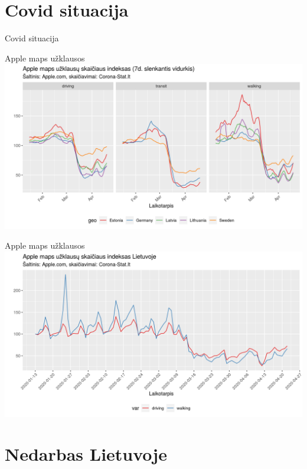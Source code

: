\documentclass[11pt]{beamer}
\begin{document}
\section{Covid situacija}
\begin{frame}{Covid situacija}

\end{frame}


\begin{frame}{Apple maps užklausos}
\includegraphics[scale=0.5]{apple_judejimas.png}
\end{frame}

\begin{frame}{Apple maps užklausos}
\includegraphics[scale=0.5]{apple_judejimas_lt.png}
\end{frame}

\section{Nedarbas Lietuvoje}
\end{document}
